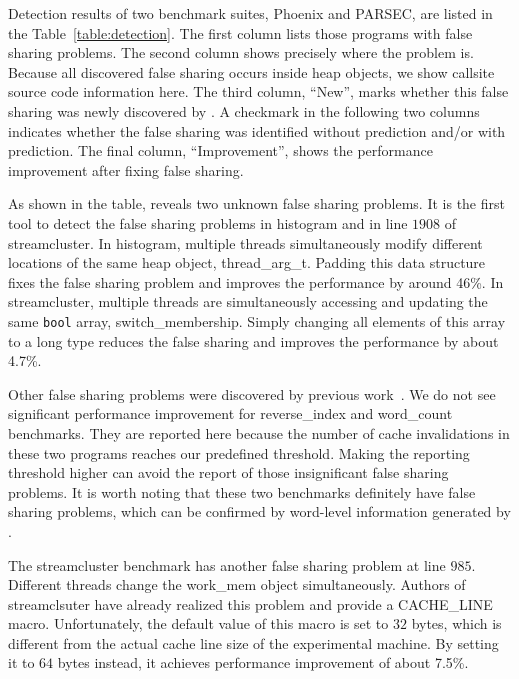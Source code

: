 Detection results of two benchmark suites, Phoenix and PARSEC, are listed in the Table~\ref{table:detection}. 
The first column lists those programs with false sharing problems.  The second column shows precisely where the problem is. Because all discovered false sharing occurs inside heap objects, we show callsite source code information here.  The third column, ``New'', marks whether this false sharing was newly discovered by \Predator{}.  A checkmark in the following two columns indicates whether the false sharing was identified without
prediction and/or with prediction.  The final column, ``Improvement'', shows the performance improvement after fixing false sharing.

As shown in the table, \Predator{} reveals two unknown false sharing problems. It is the first tool to detect the false sharing problems in histogram and in line $1908$ of streamcluster. 
In histogram, multiple threads simultaneously modify different locations of the same heap object, thread\_arg\_t. 
Padding this data structure fixes the false sharing problem and improves the performance by around 46\%. In streamcluster, multiple threads are simultaneously accessing and updating the same \texttt{bool} array, switch\_membership. Simply changing all elements of this array to a long type reduces the false sharing and improves the performance by about 4.7\%.

Other false sharing problems were discovered by previous work~\cite{sheriff}. We do not see significant performance improvement for reverse\_index and word\_count benchmarks. They are reported here because the number of cache invalidations in these two programs reaches our predefined threshold.
Making the reporting threshold higher can avoid the report of those insignificant false sharing problems.
It is worth noting that these two benchmarks definitely have false sharing problems,
which can be confirmed by word-level information generated by \Predator{}. 

The streamcluster benchmark has another false sharing problem at line $985$. Different threads change the work\_mem object simultaneously. Authors of streamclsuter have already realized this problem and provide a CACHE\_LINE macro. Unfortunately, the default value of this macro is set to $32$ bytes, which is different from the actual cache line size of the experimental machine. By setting it to $64$ bytes instead, it achieves  performance improvement of about 7.5\%.

